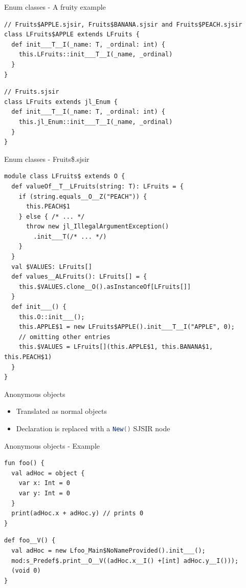 \documentclass[10pt,usenames,dvipsnames]{beamer}
\newcommand{\inlinecode}[2]{\colorbox{minted-bg}{\lstinline[language=#1]$#2$}}
\newcommand{\scalainline}[1]{\inlinecode{scala}{#1}}
\begin{document}
\begin{frame}[fragile]{Enum classes - A fruity example}
 
  \begin{verbatim}
// Fruits$APPLE.sjsir, Fruits$BANANA.sjsir and Fruits$PEACH.sjsir
class LFruits$APPLE extends LFruits {
  def init___T__I(_name: T, _ordinal: int) {
    this.LFruits::init___T__I(_name, _ordinal)
  }
}
  \end{verbatim}
  \begin{verbatim}
// Fruits.sjsir
class LFruits extends jl_Enum {
  def init___T__I(_name: T, _ordinal: int) {
    this.jl_Enum::init___T__I(_name, _ordinal)
  }
}
  \end{verbatim}
  
\end{frame}

\begin{frame}[fragile]{Enum classes - Fruits\$.sjsir}
  \begin{verbatim}
module class LFruits$ extends O {
  def valueOf__T__LFruits(string: T): LFruits = {
    if (string.equals__O__Z("PEACH")) {
      this.PEACH$1    
    } else { /* ... */
      throw new jl_IllegalArgumentException()
        .init___T(/* ... */)
    }
  }
  val $VALUES: LFruits[]
  def values__ALFruits(): LFruits[] = {
    this.$VALUES.clone__O().asInstanceOf[LFruits[]]
  }
  def init___() {
    this.O::init___();
    this.APPLE$1 = new LFruits$APPLE().init___T__I("APPLE", 0);
    // omitting other entries
    this.$VALUES = LFruits[](this.APPLE$1, this.BANANA$1, this.PEACH$1)
  }
}

  \end{verbatim}
\end{frame}
\begin{frame}{Anonymous objects}
 \begin{itemize}
  \item Translated as normal objects
  \item Declaration is replaced with a \scalainline{New()} SJSIR node
 \end{itemize}

\end{frame}

\begin{frame}[fragile]{Anonymous objects - Example}
 \begin{verbatim} 
fun foo() {
  val adHoc = object {
    var x: Int = 0
    var y: Int = 0
  }
  print(adHoc.x + adHoc.y) // prints 0
}
 \end{verbatim}

  \begin{verbatim}
def foo__V() {
  val adHoc = new Lfoo_Main$NoNameProvided().init___();
  mod:s_Predef$.print__O__V((adHoc.x__I() +[int] adHoc.y__I()));
  (void 0)
}
  \end{verbatim}
\end{frame}
\end{document}
